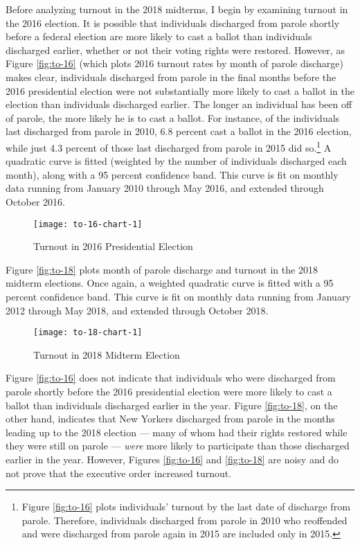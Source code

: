 \documentclass[
  12pt,
]{article}
\begin{document}
Before analyzing turnout in the 2018 midterms, I begin by examining turnout in the 2016 election. It is possible that individuals discharged from parole shortly before a federal election are more likely to cast a ballot than individuals discharged earlier, whether or not their voting rights were restored. However, as Figure \ref{fig:to-16} (which plots 2016 turnout rates by month of parole discharge) makes clear, individuals discharged from parole in the final months before the 2016 presidential election were not substantially more likely to cast a ballot in the election than individuals discharged earlier. The longer an individual has been off of parole, the more likely he is to cast a ballot. For instance, of the individuals last discharged from parole in 2010, 6.8 percent cast a ballot in the 2016 election, while just 4.3 percent of those last discharged from parole in 2015 did so.\footnote{Figure \ref{fig:to-16} plots individuals' turnout by the last date of discharge from parole. Therefore, individuals discharged from parole in 2010 who reoffended and were discharged from parole again in 2015 are included only in 2015.} A quadratic curve is fitted (weighted by the number of individuals discharged each month), along with a 95 percent confidence band. This curve is fit on monthly data running from January 2010 through May 2016, and extended through October 2016.

\begin{figure}[H]

{\centering \texttt{[image: to-16-chart-1]} 

}

\caption{\label{fig:to-16}Turnout in 2016 Presidential Election}\label{fig:to-16-chart}
\end{figure}

Figure \ref{fig:to-18} plots month of parole discharge and turnout in the 2018 midterm elections. Once again, a weighted quadratic curve is fitted with a 95 percent confidence band. This curve is fit on monthly data running from January 2012 through May 2018, and extended through October 2018.

\begin{figure}[H]

{\centering \texttt{[image: to-18-chart-1]} 

}

\caption{\label{fig:to-18}Turnout in 2018 Midterm Election}\label{fig:to-18-chart}
\end{figure}

Figure \ref{fig:to-16} does not indicate that individuals who were discharged from parole shortly before the 2016 presidential election were more likely to cast a ballot than individuals discharged earlier in the year. Figure \ref{fig:to-18}, on the other hand, indicates that New Yorkers discharged from parole in the months leading up to the 2018 election --- many of whom had their rights restored while they were still on parole --- \emph{were} more likely to participate than those discharged earlier in the year. However, Figures \ref{fig:to-16} and \ref{fig:to-18} are noisy and do not prove that the executive order increased turnout.
\end{document}
